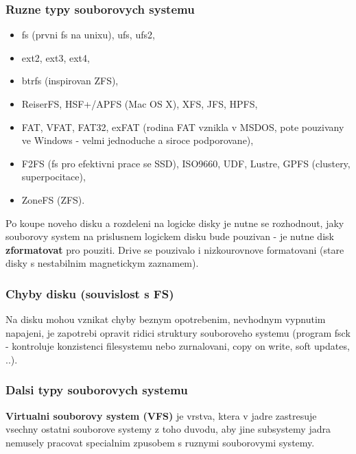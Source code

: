 \documentclass[a4paper, 11pt]{article}
\begin{document}
\subsubsection{Ruzne typy souborovych systemu}
\begin{itemize}
    \item fs (prvni fs na unixu), ufs, ufs2,
    \item ext2, ext3, ext4,
    \item btrfs (inspirovan ZFS),
    \item ReiserFS, HSF+/APFS (Mac OS X), XFS, JFS, HPFS,
    \item FAT, VFAT, FAT32, exFAT (rodina FAT vznikla v MSDOS, pote pouzivany ve Windows - velmi jednoduche a siroce podporovane),
    \item F2FS (fs pro efektivni prace se SSD), ISO9660, UDF, Lustre, GPFS (clustery, superpocitace),
    \item ZoneFS (ZFS). \\
\end{itemize}

\noindent Po koupe noveho disku a rozdeleni na logicke disky je nutne se rozhodnout, jaky souborovy system na prislusnem logickem disku bude pouzivan - je nutne disk \textbf{zformatovat} pro pouziti. Drive se pouzivalo i nizkourovnove formatovani (stare disky s nestabilnim magnetickym zaznamem). \\

\newpage

\subsubsection{Chyby disku (souvislost s FS)}

\noindent Na disku mohou vznikat chyby beznym opotrebenim, nevhodnym vypnutim napajeni, je zapotrebi opravit ridici struktury souboroveho systemu (program fsck - kontroluje konzistenci filesystemu nebo zurnalovani, copy on write, soft updates, ..). \\

\subsubsection{Dalsi typy souborovych systemu}

\noindent\textbf{Virtualni souborovy system (VFS)} je vrstva, ktera v jadre zastresuje vsechny ostatni souborove systemy z toho duvodu, aby jine subsystemy jadra nemusely pracovat specialnim zpusobem s ruznymi souborovymi systemy.  \\
\end{document}
